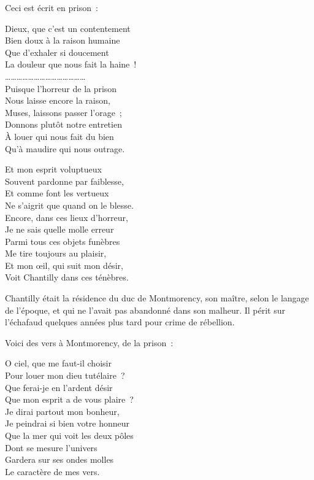 \documentclass[french,twoside]{book} %
\newenvironment{quoteblock}%
  {\begin{quoting}}
  {\end{quoting}}
\newenvironment{quotebar}{%
    \def\FrameCommand{{\color{rubric!10!}\vrule width 0.5em} \hspace{0.9em}}%
    \def\OuterFrameSep{\itemsep} %
    \MakeFramed {\advance\hsize-\width \FrameRestore}
  }%
  {%
    \endMakeFramed
  }
\renewenvironment{quoteblock}%
  {%
    \savenotes
    \setstretch{0.9}
    \normalfont
    \begin{quotebar}
  }
  {%
    \end{quotebar}
    \spewnotes
  }
\begin{document}
\noindent Ceci est écrit en prison :\par

\begin{quoteblock}
 \noindent Dieux, que c'est un contentement \\
Bien doux à la raison humaine \\
Que d'exhaler si doucement \\
La douleur que nous fait la haine ! \\
…………………………………… \\
Puisque l'horreur de la prison \\
Nous laisse encore la raison, \\
Muses, laissons passer l'orage ; \\
Donnons plutôt notre entretien \\
À louer qui nous fait du bien \\
Qu'à maudire qui nous outrage.\par
 Et mon esprit voluptueux \\
Souvent pardonne par faiblesse, \\
Et comme font les vertueux \\
Ne s'aigrit que quand on le blesse. \\
Encore, dans ces lieux d'horreur, \\
Je ne sais quelle molle erreur \\
Parmi tous ces objets funèbres \\
Me tire toujours au plaisir, \\
Et mon œil, qui suit mon désir, \\
Voit Chantilly dans ces ténèbres.
 \end{quoteblock}

\noindent Chantilly était la résidence du duc de Montmorency, son maître, selon le langage de l'époque, et qui ne l'avait pas abandonné dans son malheur. Il périt sur l'échafaud quelques années plus tard pour crime de rébellion.\par
Voici des vers à Montmorency, de la prison :\par

\begin{quoteblock}
 \noindent O ciel, que me faut-il choisir \\
Pour louer mon dieu tutélaire ? \\
Que ferai-je en l'ardent désir \\
Que mon esprit a de vous plaire ? \\
Je dirai partout mon bonheur, \\
Je peindrai si bien votre honneur \\
Que la mer qui voit les deux pôles \\
Dont se mesure l'univers \\
Gardera sur ses ondes molles \\
Le caractère de mes vers.
 \end{quoteblock}
\end{document}
